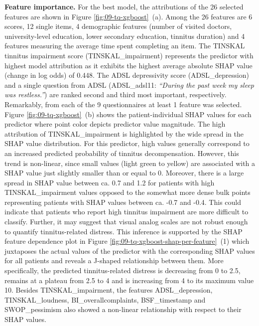 \documentclass[
  oneside]{book}
\begin{document}
\textbf{Feature importance.} For the best model, the attributions of the 26 selected features are shown in Figure \ref{fig:09-tq-xgboost}~(a).
Among the 26 features are 6 scores, 12 single items, 4 demographic features (number of visited doctors, university-level education, lower secondary education, tinnitus duration) and 4 features measuring the average time spent completing an item.
The TINSKAL tinnitus impairment score (TINSKAL\_impairment) represents the predictor with highest model attribution as it exhibits the highest average absolute SHAP value (change in log odds) of 0.448.
The ADSL depressivity score (ADSL\_depression) and a single question from ADSL (ADSL\_adsl11: \emph{``During the past week my sleep was restless.''}) are ranked second and third most important, respectively.
Remarkably, from each of the 9 questionnaires at least 1 feature was selected.
Figure \ref{fig:09-tq-xgboost}~(b) shows the patient-individual SHAP values for each predictor where point color depicts predictor value magnitude.
The high attribution of TINSKAL\_impairment is highlighted by the wide spread in the SHAP value distribution.
For this predictor, high values generally correspond to an increased predicted probability of tinnitus decompensation.
However, this trend is non-linear, since small values (light green to yellow) are associated with a SHAP value just slightly smaller than or equal to 0.
Moreover, there is a large spread in SHAP value between ca. 0.7 and 1.2 for patients with high TINSKAL\_impairment values opposed to the somewhat more dense bulk points representing patients with SHAP values between ca. -0.7 and -0.4.
This could indicate that patients who report high tinnitus impairment are more difficult to classify.
Further, it may suggest that visual analog scales are not robust enough to quantify tinnitus-related distress.
This inference is supported by the SHAP feature dependence plot in Figure \ref{fig:09-tq-xgboost-shap-per-feature}~(1) which juxtaposes the actual values of the predictor with the corresponding SHAP values for all patients and reveals a J-shaped relationship between them.
More specifically, the predicted tinnitus-related distress is decreasing from 0 to 2.5, remains at a plateau from 2.5 to 4 and is increasing from 4 to its maximum value 10.
Besides TINSKAL\_impairment, the features ADSL\_depression, TINSKAL\_loudness, BI\_overallcomplaints, BSF\_timestamp and SWOP\_pessimism also showed a non-linear relationship with respect to their SHAP values.
\end{document}
